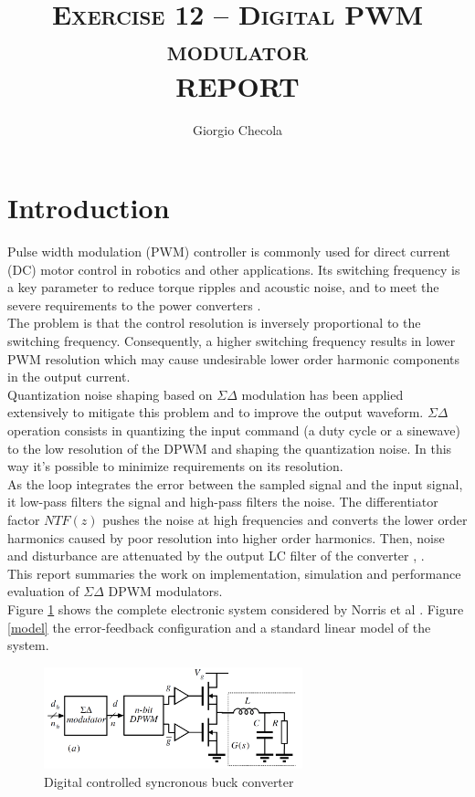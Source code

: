 \documentclass[11pt,a4paper]{article}
\title {\textbf{\textsc{Exercise 12 – Digital PWM modulator}} \\[1ex] \textsc{REPORT}}
\author{Giorgio Checola}
\begin{document}
\graphicspath{ {./images/} }
\maketitle
\thispagestyle{empty}
\newpage
\thispagestyle{empty}
\mbox{}
\newpage


\section{Introduction}
Pulse width modulation (PWM) controller is commonly used for direct current (DC) motor control in robotics and other applications. Its switching frequency is a key parameter to reduce torque ripples and acoustic noise, and to meet the severe requirements to the power converters \cite{sato2007output}. \\
The problem is that the control resolution is inversely proportional to the switching frequency. Consequently, a higher switching frequency results in lower PWM resolution which may cause undesirable lower order harmonic components in the output current. \\
Quantization noise shaping based on $\Sigma\Delta$ modulation has been applied extensively to mitigate this problem and to improve the output waveform. $\Sigma\Delta$ operation consists in quantizing the input command (a duty cycle or a sinewave) to the low resolution of the DPWM and shaping the quantization noise. In this way it's possible to minimize requirements on its resolution. \\
As the loop integrates the error between the sampled signal and the input signal, it low-pass filters the signal and high-pass filters the noise. The differentiator factor $NTF(z)$ pushes the noise at high frequencies and converts the lower order harmonics caused by poor resolution into higher order harmonics. Then, noise and disturbance are attenuated by the output LC filter of the converter \cite{deblecker2011high}, \cite{lukic2007multibit}. \\
This report summaries the work on implementation, simulation and performance evaluation of $\Sigma\Delta$ DPWM modulators.\\
Figure \ref{buck} shows the complete electronic system considered by Norris et al \cite{norris2008quantization}. Figure \ref{model} the error-feedback configuration and a standard linear model of the system. 
\begin{figure}[H]
	\centering
	\includegraphics[width=75mm]{images/buckconverter.png}
	\caption{Digital controlled syncronous buck converter}
	\label{buck}
\end{figure}
\end{document}
